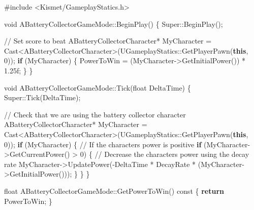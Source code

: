 \documentclass[
  letterpaper,
  DIV=11,
  numbers=noendperiod]{scrartcl}
\newenvironment{Shaded}{\begin{snugshade}}{\end{snugshade}}
\newcommand{\AttributeTok}[1]{\textcolor[rgb]{0.40,0.45,0.13}{#1}}
\newcommand{\BuiltInTok}[1]{\textcolor[rgb]{0.00,0.23,0.31}{#1}}
\newcommand{\CommentTok}[1]{\textcolor[rgb]{0.37,0.37,0.37}{#1}}
\newcommand{\ControlFlowTok}[1]{\textcolor[rgb]{0.00,0.23,0.31}{\textbf{#1}}}
\newcommand{\DataTypeTok}[1]{\textcolor[rgb]{0.68,0.00,0.00}{#1}}
\newcommand{\DecValTok}[1]{\textcolor[rgb]{0.68,0.00,0.00}{#1}}
\newcommand{\FloatTok}[1]{\textcolor[rgb]{0.68,0.00,0.00}{#1}}
\newcommand{\ImportTok}[1]{\textcolor[rgb]{0.00,0.46,0.62}{#1}}
\newcommand{\KeywordTok}[1]{\textcolor[rgb]{0.00,0.23,0.31}{\textbf{#1}}}
\newcommand{\NormalTok}[1]{\textcolor[rgb]{0.00,0.23,0.31}{#1}}
\newcommand{\OperatorTok}[1]{\textcolor[rgb]{0.37,0.37,0.37}{#1}}
\newcommand{\PreprocessorTok}[1]{\textcolor[rgb]{0.68,0.00,0.00}{#1}}
\begin{document}
\begin{Shaded}
\begin{Highlighting}[]
\PreprocessorTok{\#include }\ImportTok{\textless{}Kismet/GameplayStatics.h\textgreater{}}

\DataTypeTok{void}\NormalTok{ ABatteryCollectorGameMode}\OperatorTok{::}\NormalTok{BeginPlay}\OperatorTok{()}
\OperatorTok{\{}
\NormalTok{    Super}\OperatorTok{::}\NormalTok{BeginPlay}\OperatorTok{();}
    
    \CommentTok{// Set score to beat}
\NormalTok{    ABatteryCollectorCharacter}\OperatorTok{*}\NormalTok{ MyCharacter }\OperatorTok{=}\NormalTok{ Cast}\OperatorTok{\textless{}}\NormalTok{ABatteryCollectorCharacter}\OperatorTok{\textgreater{}(}\NormalTok{UGameplayStatics}\OperatorTok{::}\NormalTok{GetPlayerPawn}\OperatorTok{(}\KeywordTok{this}\OperatorTok{,} \DecValTok{0}\OperatorTok{));}
    \ControlFlowTok{if} \OperatorTok{(}\NormalTok{MyCharacter}\OperatorTok{)}
    \OperatorTok{\{}
\NormalTok{        PowerToWin }\OperatorTok{=} \OperatorTok{(}\NormalTok{MyCharacter}\OperatorTok{{-}\textgreater{}}\NormalTok{GetInitialPower}\OperatorTok{())} \OperatorTok{*} \FloatTok{1.25}\BuiltInTok{f}\OperatorTok{;}
    \OperatorTok{\}}
\OperatorTok{\}}

\DataTypeTok{void}\NormalTok{ ABatteryCollectorGameMode}\OperatorTok{::}\NormalTok{Tick}\OperatorTok{(}\DataTypeTok{float}\NormalTok{ DeltaTime}\OperatorTok{)}
\OperatorTok{\{}
\NormalTok{    Super}\OperatorTok{::}\NormalTok{Tick}\OperatorTok{(}\NormalTok{DeltaTime}\OperatorTok{);}
    
    \CommentTok{// Check that we are using the battery collector character }
\NormalTok{    ABatteryCollectorCharacter}\OperatorTok{*}\NormalTok{ MyCharacter }\OperatorTok{=}\NormalTok{ Cast}\OperatorTok{\textless{}}\NormalTok{ABatteryCollectorCharacter}\OperatorTok{\textgreater{}(}\NormalTok{UGameplayStatics}\OperatorTok{::}\NormalTok{GetPlayerPawn}\OperatorTok{(}\KeywordTok{this}\OperatorTok{,} \DecValTok{0}\OperatorTok{));}
    \ControlFlowTok{if} \OperatorTok{(}\NormalTok{MyCharacter}\OperatorTok{)}
    \OperatorTok{\{}
        \CommentTok{// If the character\textquotesingle{}s power is positive}
        \ControlFlowTok{if} \OperatorTok{(}\NormalTok{MyCharacter}\OperatorTok{{-}\textgreater{}}\NormalTok{GetCurrentPower}\OperatorTok{()} \OperatorTok{\textgreater{}} \DecValTok{0}\OperatorTok{)}
        \OperatorTok{\{}
            \CommentTok{// Decrease the character\textquotesingle{}s power using the decay rate}
\NormalTok{            MyCharacter}\OperatorTok{{-}\textgreater{}}\NormalTok{UpdatePower}\OperatorTok{({-}}\NormalTok{DeltaTime }\OperatorTok{*}\NormalTok{ DecayRate }\OperatorTok{*} \OperatorTok{(}\NormalTok{MyCharacter}\OperatorTok{{-}\textgreater{}}\NormalTok{GetInitialPower}\OperatorTok{()));}
        \OperatorTok{\}}
    \OperatorTok{\}}
\OperatorTok{\}}

\DataTypeTok{float}\NormalTok{ ABatteryCollectorGameMode}\OperatorTok{::}\NormalTok{GetPowerToWin}\OperatorTok{()} \AttributeTok{const}
\OperatorTok{\{}
    \ControlFlowTok{return}\NormalTok{ PowerToWin}\OperatorTok{;}
\OperatorTok{\}}
\end{Highlighting}
\end{Shaded}
\end{document}
